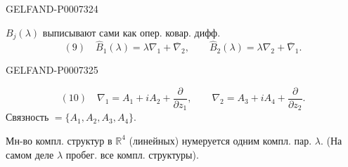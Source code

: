 \begin{GelfandAdjacentEvidence}{GELFAND-P000732}{4}


\(B_j(\lambda)\) выписывают сами как опер. ковар. дифф.
\[
(9)\quad \widehat B_1(\lambda)=\lambda\nabla_1+\overline{\nabla}_2,\qquad
\widehat B_2(\lambda)=\lambda\nabla_2+\overline{\nabla}_1.
\]
\end{GelfandAdjacentEvidence}
\begin{GelfandAdjacentEvidence}{GELFAND-P000732}{5}

\[
(10)\quad
\nabla_1=A_1+iA_2+\frac{\partial}{\partial z_1},\qquad
\nabla_2=A_3+iA_4+\frac{\partial}{\partial z_2}.
\]
Связность \(=\{A_1,A_2,A_3,A_4\}\).

Мн-во компл. структур в \(\mathbb R^4\) (линейных) нумеруется одним компл. пар. \(\lambda\).
(На самом деле \(\lambda\) пробег. все компл. структуры).
\end{GelfandAdjacentEvidence}



